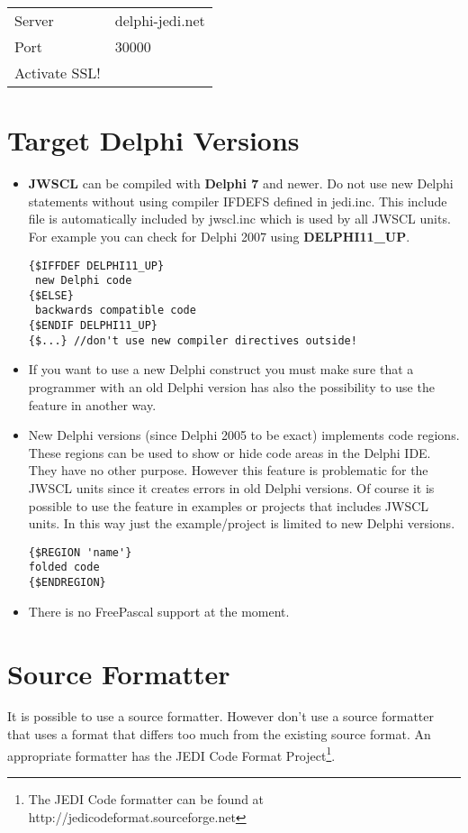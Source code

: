 \documentclass[a4paper,oneside,10pt]{article}
\begin{document}
\begin{tabular}{ll}
Server 	 & delphi-jedi.net\\			
Port	   & 30000\\
Activate SSL!\\
\end{tabular}


\section{Target Delphi Versions}
\begin{itemize}
	\item \textbf{JWSCL} can be compiled with \textbf{Delphi 7} and newer. Do not use new Delphi statements without using compiler IFDEFS defined in jedi.inc. This include file is automatically included by jwscl.inc which is used by all JWSCL units. For example you can check for Delphi 2007 using \textbf{DELPHI11\_UP}.
\begin{lstlisting} 
{$IFFDEF DELPHI11_UP}
 new Delphi code
{$ELSE}
 backwards compatible code
{$ENDIF DELPHI11_UP}
{$...} //don't use new compiler directives outside!
\end{lstlisting}  
\item If you want to use a new Delphi construct you must make sure that a programmer with an old Delphi version has also the possibility to use the feature in another way.
\item New Delphi versions (since Delphi 2005 to be exact) implements code regions. These regions can be used to show or hide code areas in the Delphi IDE. They have no other purpose. However this feature is problematic for the JWSCL units since it creates errors in old Delphi versions. Of course it is possible to use the feature in examples or projects that includes JWSCL units. In this way just the example/project is limited to new Delphi versions.

\begin{lstlisting}
{$REGION 'name'}
folded code    
{$ENDREGION}
\end{lstlisting}

\item There is no FreePascal support at the moment.
\end{itemize}

\label{SourceFormatter}
\section{Source Formatter}
It is possible to use a source formatter. However don't use a source formatter that uses a format that differs too much from the existing source format. An appropriate formatter has the JEDI Code Format Project\footnote{The JEDI Code formatter can be found at http://jedicodeformat.sourceforge.net}.
\end{document}
